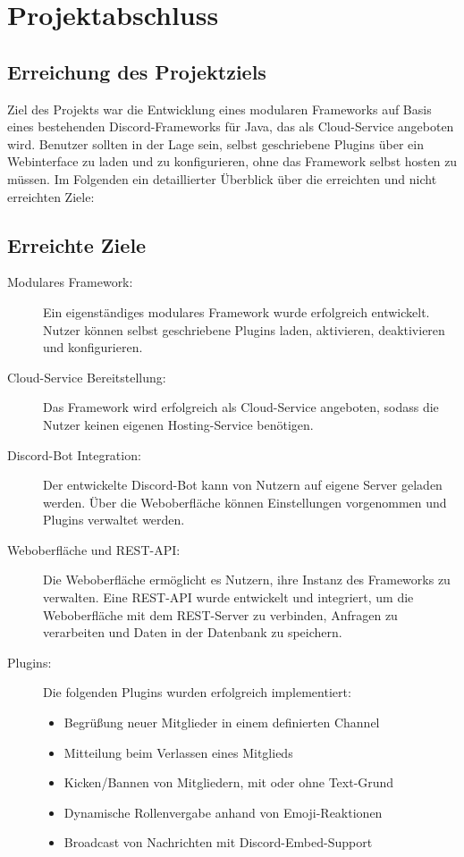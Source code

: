 
\section{Projektabschluss}\label{projektabschluss}

\subsection{Erreichung des Projektziels}\label{erreichung-des-projektziels}

Ziel des Projekts war die Entwicklung eines modularen Frameworks auf Basis eines bestehenden Discord-Frameworks für Java, das als Cloud-Service angeboten wird. Benutzer sollten in der Lage sein, selbst geschriebene Plugins über ein Webinterface zu laden und zu konfigurieren, ohne das Framework selbst hosten zu müssen. Im Folgenden ein detaillierter Überblick über die erreichten und nicht erreichten Ziele:

\subsection*{Erreichte Ziele}

\begin{description}
    \item[Modulares Framework:] Ein eigenständiges modulares Framework wurde erfolgreich entwickelt. Nutzer können selbst geschriebene Plugins laden, aktivieren, deaktivieren und konfigurieren.
    \item[Cloud-Service Bereitstellung:] Das Framework wird erfolgreich als Cloud-Service angeboten, sodass die Nutzer keinen eigenen Hosting-Service benötigen.
    \item[Discord-Bot Integration:] Der entwickelte Discord-Bot kann von Nutzern auf eigene Server geladen werden. Über die Weboberfläche können Einstellungen vorgenommen und Plugins verwaltet werden.
    \item[Weboberfläche und REST-API:] Die Weboberfläche ermöglicht es Nutzern, ihre Instanz des Frameworks zu verwalten. Eine REST-API wurde entwickelt und integriert, um die Weboberfläche mit dem REST-Server zu verbinden, Anfragen zu verarbeiten und Daten in der Datenbank zu speichern.
    \item[Plugins:] Die folgenden Plugins wurden erfolgreich implementiert:
    \begin{itemize}
        \item Begrüßung neuer Mitglieder in einem definierten Channel
        \item Mitteilung beim Verlassen eines Mitglieds
        \item Kicken/Bannen von Mitgliedern, mit oder ohne Text-Grund
        \item Dynamische Rollenvergabe anhand von Emoji-Reaktionen
        \item Broadcast von Nachrichten mit Discord-Embed-Support
    \end{itemize}
\end{description}

